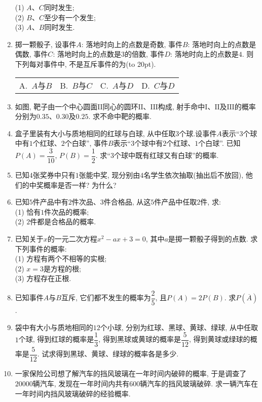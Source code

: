 \documentclass[10pt,a4paper]{article}
\newcommand{\bracket}[1]{(\hbox to #1pt{})}
\newcommand{\fourch}[4]{\par\begin{tabular}{p{.23\textwidth}p{.23\textwidth}p{.23\textwidth}p{.23\textwidth}}
A.~#1 &B.~#2& C.~#3& D.~#4
\end{tabular}}
\begin{document}
\begin{enumerate}[1.]
(1) $A$、$C$同时发生;\\
(2) $B$、$C$至少有一个发生;\\
(3) $A$、$B$同时发生.
\item 掷一颗骰子, 设事件$A$: 落地时向上的点数是奇数, 事件$B$: 落地时向上的点数是偶数, 事件$C$: 落地时向上的点数是$3$的倍数, 事件$D$: 落地时向上的点数是$4$. 则下列每对事件中, 不是互斥事件的为\bracket{20}.
\fourch{$A$与$B$}{$B$与$C$}{$A$与$D$}{$C$与$D$}
\item 如图, 靶子由一个中心圆面$\text{I}$$\text{I}$同心的圆环$\text{II}$、$\text{III}$构成, 射手命中$\text{I}$、$\text{II}$及$\text{III}$的概率分别为$0.35$、$0.30$及$0.25$. 求不命中靶的概率.
\begin{center}
\end{center}
\item 盒子里装有大小与质地相同的红球与白球, 从中任取$3$个球.设事件$A$表示``$3$个球中有$1$个红球、$2$个白球'', 事件$B$表示``3个球中有$2$个红球、$1$个白球''. 已知$P(A)=\dfrac{3}{10}$, $P(B)=\dfrac 12$. 求``$3$个球中既有红球又有白球''的概率.
\item 已知$4$张奖券中只有$1$张能中奖, 现分别由$4$名学生依次抽取(抽出后不放回), 他们的中奖概率是否一样? 为什么?
\item 已知$5$件产品中有$2$件次品、$3$件合格品, 从这$5$件产品中任取$2$件, 求:\\
(1) 恰有$1$件次品的概率;\\
(2) $2$件都是合格品的概率.
\item 已知关于$x$的一元二次方程$x^2-ax+3=0$, 其中$a$是掷一颗骰子得到的点数. 求下列事件的概率:\\
(1) 方程有两个不相等的实根;\\
(2) $x=3$是方程的根;\\
(3) 方程存在正根.
\item 已知事件$A$与$B$互斥, 它们都不发生的概率为$\dfrac 25$, 且$P(A)=2P(B)$. 求$P(\overline A)$.
\item 袋中有大小与质地相同的$12$个小球, 分别为红球、黑球、黄球、绿球, 从中任取$1$个球, 得到红球的概率是$\dfrac 13$, 得到黑球或黄球的概率是$\dfrac{5}{12}$, 得到黄球或绿球的概率是$\dfrac{5}{12}$. 试求得到黑球、黄球、绿球的概率各是多少.
\item 一家保险公司想了解汽车的挡风玻璃在一年时间内破碎的概率, 于是调查了$20000$辆汽车, 发现在一年时间内共有$600$辆汽车的挡风玻璃破碎. 求一辆汽车在一年时间内挡风玻璃破碎的经验概率.
$$
\end{enumerate}
\end{document}
